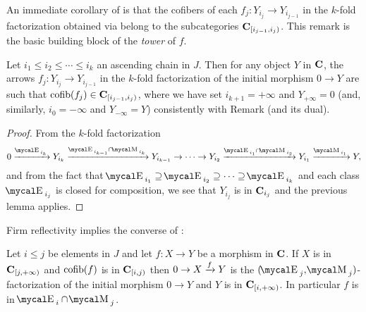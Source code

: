 An immediate corollary of  is that the cofibers of each $f_j\colon Y_{i_j}\to Y_{i_{j-1}}$ in the $k$\hyp{}fold factorization obtained via  belong to the subcategories $\textbf{C}_{[i_{j-1},i_j)}$. This remark is the basic building block of the \emph{tower} of $f$.
\begin{corollary} \label{cor:perPostnikov}
Let $i_1\leq i_2\leq\cdots\leq i_k$ an ascending chain in $J$. Then for any object $Y$ in $\textbf{C}$, the arrows $f_j\colon Y_{i_j}\to Y_{i_{j-1}}$ in the $k$\hyp{}fold factorization of the initial morphism $0\to Y$ are such that $\text{cofib}(f_j)\in \textbf{C}_{[i_{j-1},i_j)}$, where we have set $i_{k+1}=+\infty$ and $Y_{+\infty}=0$ (and, similarly, $i_{0}=-\infty$ and $Y_{-\infty}=Y$) consistently with Remark  (and its dual).
\end{corollary}
\begin{proof}
From the $k$\hyp{}fold factorization
\[
0 \xto{\EE_{i_k}} Y_{i_k} \xto{\EE_{i_{k-1}}\cap \MM_{i_k}} Y_{i_{k-1}}\to\dots\to Y_{i_{2}} \xto{\EE_{i_{1}}\cap \MM_{i_{2}}} Y_{i_1} \xto{\MM_{i_{1}}} Y,
\]
and from the fact that $\EE_{i_1}\supseteq \EE_{i_2} \supseteq\dots\supseteq \EE_{i_k}$ and each class $\EE_{i_j}$ is closed for composition, we see that $Y_{i_j}$ is in $\textbf{C}_{i_{j}}$ and the previous lemma applies.
\end{proof}
Firm reflectivity implies the converse of :
\begin{lemma}\label{lemma.vice.versa}
Let $i\leq j$ be elements in $J$ and let $f\colon X\to Y$ be a morphism in $\textbf{C}$. If $X$ is in $\textbf{C}_{[j,+\infty)}$ and $\text{cofib}(f)$ is in $\textbf{C}_{[i,j)}$ then $0\to X\xrightarrow{f}Y$ is the $(\EE_j,\MM_j)$\hyp{}factorization of the initial morphism $0\to Y$ and $Y$ is in $\textbf{C}_{[i,+\infty)}$. In particular $f$ is in $\EE_i\cap \MM_j$. \end{lemma}
